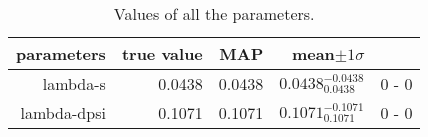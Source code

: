 \begin{table*}\caption{Values of all the parameters.}\begin{center}\begin{tabular}{ r r r r r} parameters & true value & MAP & mean$\pm 1 \sigma$ \\ 
\hline  lambda-s & 0.0438 & 0.0438 & $0.0438_{0.0438}^{-0.0438}$ & 0 - 0 \\ 
\hline lambda-dpsi & 0.1071 & 0.1071 & $0.1071_{0.1071}^{-0.1071}$ & 0 - 0 \\ 
\end{tabular}\end{center}\label{tab:1}\end{table*}